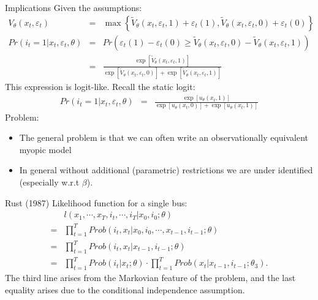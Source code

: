 \documentclass[xcolor=pdftex,dvipsnames,table,mathserif]{beamer}
\begin{document}
\begin{frame}{ Implications}
Given the assumptions:
\begin{eqnarray*}
V_{\theta}(x_t,\varepsilon_t) &=& \max \left\{ \tilde V_{\theta} (x_t, \varepsilon_t, 1) + \varepsilon_{t}(1) ,\tilde V_{\theta} (x_t, \varepsilon_t, 0) + \varepsilon_{t}(0) \right\}\\
Pr(i_t=1 | x_t,\varepsilon_t,\theta) &=& Pr\left(\varepsilon_{t}(1) - \varepsilon_{t}(0) \geq \tilde V_{\theta} (x_t, \varepsilon_t, 0) - \tilde V_{\theta} (x_t, \varepsilon_t, 1) \right) \\
&=& \frac {\exp[\tilde V_{\theta} (x_t, \varepsilon_t, 1)]  }{\exp[\tilde V_{\theta} (x_t, \varepsilon_t, 0)] + \exp[\tilde V_{\theta} (x_t, \varepsilon_t, 1)]} 
\end{eqnarray*}
This expression is logit-like. Recall the static logit:
\begin{eqnarray*}
Pr(i_t=1 | x_t,\varepsilon_t,\theta) &=& \frac {\exp[u_{\theta} (x_t, 1)]  }{\exp[u_{\theta} (x_t, 0)] + \exp[u_{\theta} (x_t, 1)]} 
\end{eqnarray*}
Problem:
\begin{itemize}
\item The general problem is that we can often write an observationally equivalent \alert{myopic model}
\item In general without additional (parametric) restrictions we are under identified (especially w.r.t $\beta$).
\end{itemize}
\end{frame}


\begin{frame}{Rust (1987)}
Likelihood function for a single bus:
\begin{equation*}
\begin{split}
& l (x_1, \cdots , x_T, i_t, \cdots , i_T | x_0, i_0 ; \theta) \\
= & \prod^T_{t=1} Prob (i_t, x_t | x_0, i_0, \cdots , x_{t-1}, i_{t-1} ; \theta) \\
= & \prod^T_{t=1} Prob (i_t, x_t |  x_{t-1}, i_{t-1} ; \theta) \\
= & \prod^T_{t=1} Prob (i_t | x_t; \theta) \cdot \prod^T_{t=1} Prob (x_t | x_{t-1}, i_{t-1} ; \theta_3) .
\end{split}
\end{equation*}
The third line arises from the Markovian feature of the problem, and the last equality arises due to the conditional independence assumption. 
\end{frame}
\end{document}
